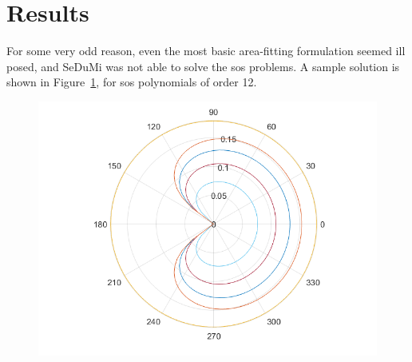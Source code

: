 \section{Results}

For some very odd reason, even the most basic area-fitting formulation
seemed ill posed, and SeDuMi was not able to solve the \gls{sos} problems.
A sample solution is shown in Figure~\ref{fig:sampleSol}, for \gls{sos}
polynomials of order 12.

\begin{figure}
    \includegraphics[width=0.6\linewidth]{figures/sampleSol.png}

    \label{fig:sampleSol}
\end{figure}
